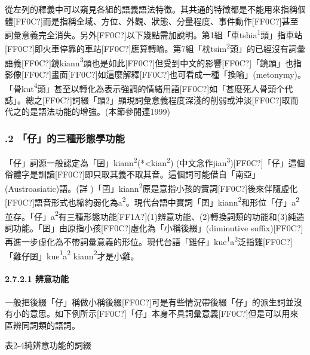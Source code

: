 \textrm{從左列的釋義中可以窺見各組的語義語法特徵。其共通的特徵都是不能用來指稱個體[FF0C?]而是指稱全域、方位、外觀、狀態、分量程度、事件動作[FF0C?]甚至詞彙意義完全消失。另外[FF0C?]以下幾點需加說明。第1組「車tshia}\textrm{\textsuperscript{1}}\textrm{頭」指車站[FF0C?]即火車停靠的車站[FF0C?]應算轉喻。第7組「枕tsim}\textrm{\textsuperscript{2}}\textrm{頭」的已經沒有詞彙語義[FF0C?]鏡kiann}\textrm{\textsuperscript{3}}\textrm{頭也是如此[FF0C?]但受到中文的影響[FF0C?]「鏡頭」也指影像[FF0C?]畫面[FF0C?]如這麼解釋[FF0C?]也可看成一種「換喻」(metonymy)。「骨kut}\textrm{\textsuperscript{4}}\textrm{頭」甚至以轉化為表示強調的情緒用語[FF0C?]如「甚麼死人骨頭个代誌」。總之[FF0C?]詞綴「頭2」顯現詞彙意義程度深淺的削弱或沖淡[FF0C?]取而代之的是語法功能的增強。(本節參閱連1999)}

\subsubsection{.2 「仔」的三種形態學功能}

\textrm{「仔」詞源一般認定為「囝」kiann}\textrm{\textsuperscript{2}}\textrm{(*<kian}\textrm{\textsuperscript{2}}\textrm{) (中文念作jian}\textrm{\textsuperscript{3}}\textrm{)[FF0C?]「仔」這個俗體字是訓讀[FF0C?]即只取其義不取其音。這個詞可能借自「南亞」(Austroasiatic)語。(詳 \citealt{NormanMei1976})「囝」kiann}\textrm{\textsuperscript{2}}\textrm{原是意指小孩的實詞[FF0C?]後來伴隨虛化[FF0C?]語音形式也縮約弱化為a}\textrm{\textsuperscript{2}}。\textrm{現代台語中實詞「囝」kiann}\textrm{\textsuperscript{2}}\textrm{和形位「仔」a}\textrm{\textsuperscript{2}}\textrm{並存。「仔」a}\textrm{\textsuperscript{2}}\textrm{有三種形態功能}[FF1A?]\textrm{(1)辨意功能、(2)轉換詞類的功能和(3)純造詞功能。「囝」由原指小孩[FF0C?]虛化為「小稱後綴」(diminutive suffix)}[FF0C?]\textrm{再進一步虛化為不帶詞彙意義的形位。現代台語「雞仔」kue}\textrm{\textsuperscript{1}}\textrm{a}\textrm{\textsuperscript{2}}\textrm{泛指雞[FF0C?]「雞仔囝」kue}\textrm{\textsuperscript{1}}\textrm{a}\textrm{\textsuperscript{2}} \textrm{kiann}\textrm{\textsuperscript{2}}\textrm{才是小雞。}

\paragraph{2.7.2.1 辨意功能}

\textrm{一般把後綴「仔」稱做小稱後綴[FF0C?]可是有些情況帶後綴「仔」的派生詞並沒有小的意思。如下例所示[FF0C?]「仔」本身不具詞彙意義[FF0C?]但是可以用來區辨同詞類的語詞。}

\rmfamily
表2-4純辨意功能的詞綴

